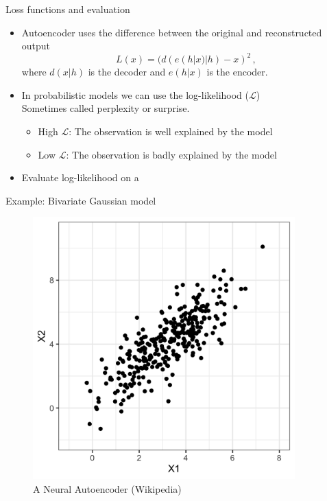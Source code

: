 \documentclass[10pt]{beamer}
\begin{document}
\begin{frame}{Loss functions and evaluation}
\begin{itemize}
\item Autoencoder uses the difference between the original and reconstructed output
\[
L(x) = (d(e(h|x)|h) - x)^2\,,
\]
where $d(x|h)$ is the decoder and $e(h|x)$ is the encoder.\pause
\item In probabilistic models we can use the log-likelihood ($\mathcal{L}$) \\ Sometimes called {\color{uured} perplexity} or {\color{uured} surprise}.
\begin{itemize}
\item {\color{uured} High} $\mathcal{L}$: The observation is {\color{uured} well} explained by the model
\item {\color{uured} Low} $\mathcal{L}$: The observation is {\color{uured} badly} explained by the model
\end{itemize}
\item Evaluate log-likelihood on a 
\end{itemize}

\end{frame}



\begin{frame}{Example: Bivariate Gaussian model}

\begin{figure}[h]
\centering
\includegraphics[width=0.9\textwidth]{fig/bi_data.png}
\caption{A Neural Autoencoder (Wikipedia)}
\end{figure}

\end{frame}
\end{document}
